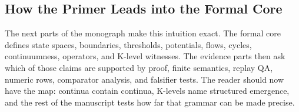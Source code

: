 \subsection{How the Primer Leads into the Formal Core}

The next parts of the monograph make this intuition exact. The formal core
defines state spaces, boundaries, thresholds, potentials, flows, cycles,
continuumness, operators, and K-level witnesses. The evidence parts then ask
which of those claims are supported by proof, finite semantics, replay QA,
numeric rows, comparator analysis, and falsifier tests. The reader should now
have the map: continua contain continua, K-levels name structured emergence,
and the rest of the manuscript tests how far that grammar can be made precise.
